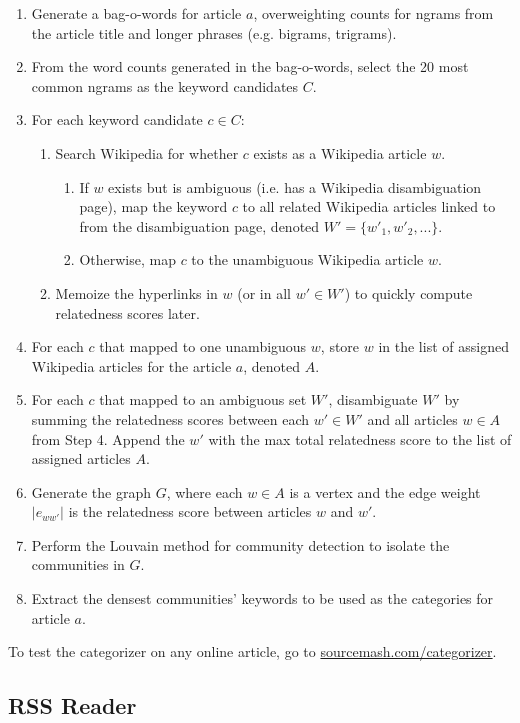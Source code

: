 \documentclass[11pt]{article}
\begin{document}
\begin{enumerate}

\item Generate a bag-o-words for article $a$, overweighting counts for ngrams from the article title and longer phrases (e.g. bigrams, trigrams).
\item From the word counts generated in the bag-o-words, select the 20 most common ngrams as the keyword candidates $C$.
\item For each keyword candidate $c \in C$:
  \begin{enumerate}
  	\item Search Wikipedia for whether $c$ exists as a Wikipedia article $w$.
  	\begin{enumerate}
 		 \item If $w$ exists but is ambiguous (i.e. has a Wikipedia disambiguation page), map the keyword $c$ to all related Wikipedia articles linked to from the disambiguation page, denoted $W' = \{w'_{1}, w'_{2}, ...\}$.
  		\item Otherwise, map $c$ to the unambiguous Wikipedia article $w$.
  	\end{enumerate}
	\item Memoize the hyperlinks in $w$ (or in all $w' \in W'$) to quickly compute relatedness scores later.
  \end{enumerate}
\item For each $c$ that mapped to one unambiguous $w$, store $w$ in the list of assigned Wikipedia articles for the article $a$, denoted $A$.
\item For each $c$ that mapped to an ambiguous set $W'$, disambiguate $W'$ by summing the relatedness scores between each $w' \in W'$ and all articles $w \in A$ from Step 4. Append the $w'$ with the max total relatedness score to the list of assigned articles $A$.
\item Generate the graph $G$, where each $w \in A$ is a vertex and the edge weight $|e_{ww'}|$ is the relatedness score between articles $w$ and $w'$.
\item Perform the Louvain method for community detection\cite{Blondel} to isolate the communities in $G$.
\item Extract the densest communities' keywords to be used as the categories for article $a$.
\end{enumerate}

To test the categorizer on any online article, go to \url{sourcemash.com/categorizer}.

\subsection{RSS Reader}
\end{document}
